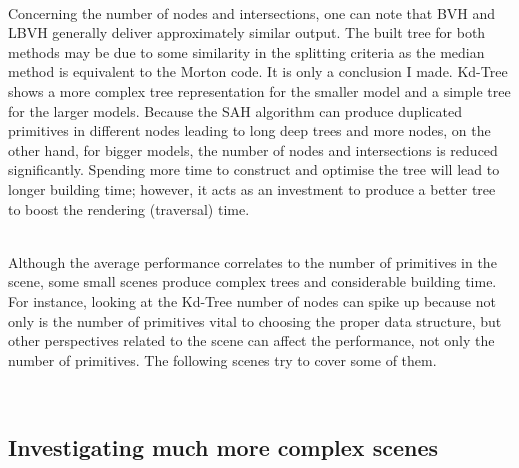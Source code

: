 \documentclass[11pt,a4paper]{article}
\begin{document}
\noindent
\\
Concerning the number of nodes and intersections, one can note that BVH and LBVH generally deliver approximately similar output. The built tree for both methods may be due to some similarity in the splitting criteria as the median method is equivalent to the Morton code. It is only a conclusion I made. Kd-Tree shows a more complex tree representation for the smaller model and a simple tree for the larger models. Because the SAH algorithm can produce duplicated primitives in different nodes leading to long deep trees and more nodes, on the other hand, for bigger models, the number of nodes and intersections is reduced significantly. Spending more time to construct and optimise the tree will lead to longer building time; however, it acts as an investment to produce a better tree to boost the rendering (traversal) time.


\noindent
\\
Although the average performance correlates to the number of primitives in the scene, some small scenes produce complex trees and considerable building time. For instance, looking at the Kd-Tree number of nodes can spike up because not only is the number of primitives vital to choosing the proper data structure, but other perspectives related to the scene can affect the performance, not only the number of primitives. The following scenes try to cover some of them.

\noindent
\\
\subsection{Investigating much more complex scenes}
\end{document}
